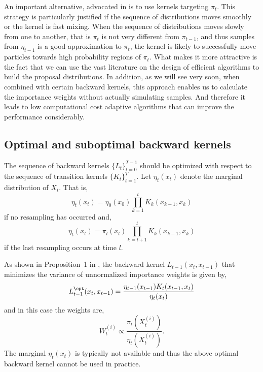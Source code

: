 An important alternative, advocated in \cite{DelMoral:2006hc} is to use \mcmc kernels targeting $\pi_t$. This strategy is particularly justified if the sequence of distributions moves smoothly or the kernel is fast mixing. When the sequence of distributions moves slowly from one to another, that is $\pi_t$ is not very different from $\pi_{t-1}$, and thus samples from $\eta_{t-1}$ is a good approximation to $\pi_t$, the kernel is likely to successfully move particles towards high probability regions of $\pi_t$. What makes it more attractive is the fact that we can use the vast literature on the design of efficient \mcmc algorithms to build the proposal distributions. In addition, as we will see very soon, when combined with certain backward kernels, this approach enables us to calculate the importance weights without actually simulating samples. And therefore it leads to low computational cost adaptive algorithms that can improve the performance considerably.

\subsection{Optimal and suboptimal backward kernels}
\label{sub:Optimal and suboptimal backward kernels}

The sequence of backward kernels $\{L_t\}_{t=0}^{T-1}$ should be optimized with respect to the sequence of transition kernels $\{K_t\}_{t=1}^T$. Let $\eta_t(x_t)$ denote the marginal distribution of $X_t$. That is,
\begin{equation}
  \eta_t(x_t) = \eta_0(x_0)\prod_{k=1}^tK_k(x_{k-1},x_k)
\end{equation}
if no resampling has occurred and,
\begin{equation}
  \eta_t(x_t) = \pi_l(x_l)\prod_{k=l+1}^tK_k(x_{k-1},x_k)
\end{equation}
if the last resampling occurs at time $l$.

As shown in Proposition~1{} in \cite{DelMoral:2006hc}, the backward kernel $L_{t-1}(x_t, x_{t-1})$ that minimizes the variance of unnormalized importance weights is given by,
\begin{equation}
  L_{t-1}^{\opt}(x_t,x_{t-1}) =
  \frac{\eta_{t-1}(x_{t-1})K_t(x_{t-1},x_t)}{\eta_t(x_t)}
\end{equation}
and in this case the weights are,
\begin{equation}
  W_t^{(i)} \propto \frac{\pi_t(X_t^{(i)})}{\eta_t(X_t^{(i)})}.
\end{equation}
The marginal $\eta_t(x_t)$ is typically not available and thus the above optimal backward kernel cannot be used in practice.

